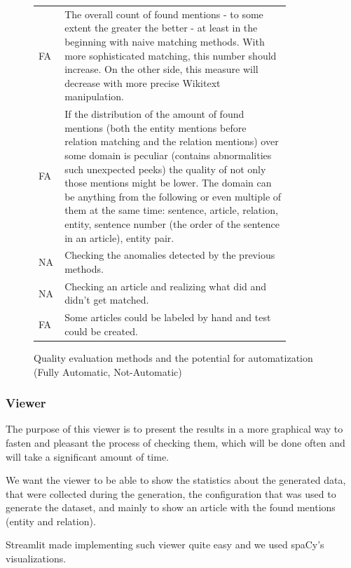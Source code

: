 \begin{figure}

\begin{tabular}{p{0.05\linewidth}p{0.8\linewidth}}

FA & The overall count of found mentions - to some extent the greater the better - at least in the beginning with naive matching methods. With more sophisticated matching, this number should increase. On the other side, this measure will decrease with more precise Wikitext manipulation. \\ 
FA & If the distribution of the amount of found mentions (both the entity mentions before relation matching and the relation mentions) over some domain is peculiar (contains abnormalities such unexpected peeks) the quality of not only those mentions might be lower. The domain can be anything from the following or even multiple of them at the same time:
sentence, article, relation, entity, sentence number (the order of the sentence in an article), entity pair. \\ 
NA & Checking the anomalies detected by the previous methods.  \\ 
NA & Checking an article and realizing what did and didn't get matched. \\ 
FA & Some articles could be labeled by hand and test could be created.\\

\end{tabular} 

\caption{Quality evaluation methods and the potential for automatization (Fully Automatic, Not-Automatic)}
\label{tab:qualityEval}
\end{figure}


\subsubsection{Viewer}

The purpose of this viewer is to present the results in a more graphical way to fasten and pleasant the process of checking them, which will be done often and will take a significant amount of time.

We want the viewer to be able to show the statistics about the generated data, that were collected during the generation, the configuration that was used to generate the dataset, and mainly to show an article with the found mentions (entity and relation). 

Streamlit made implementing such viewer quite easy and we used spaCy’s  visualizations. 

